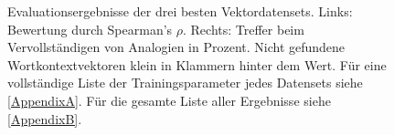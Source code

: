   \begin{figure}[h]
    \centering


    \caption[Evaluationsergebnisse der besten Vektordatensets]{Evaluationsergebnisse der drei besten Vektordatensets. Links:
    Bewertung durch Spearman's $\rho$. Rechts: Treffer beim Vervollständigen
    von Analogien in Prozent. Nicht gefundene Wortkontextvektoren klein in Klammern hinter dem Wert. Für eine vollständige Liste
    der Trainingsparameter jedes Datensets siehe \ref{AppendixA}. Für die gesamte Liste aller Ergebnisse siehe \ref{AppendixB}.}
  \end{figure}

